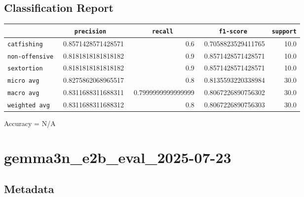 \documentclass{article}
\begin{document}
\subsection{Classification Report}

\begin{center}
\begin{tabular}{l | r | r | r | r} \hline
    \verb|            | & \verb|    precision     | & \verb|      recall      | & \verb|     f1-score     | & \verb|support| \\ \hline
    \hline
    \verb|catfishing | & 0.8571428571428571 & 0.6 & 0.7058823529411765 &    10.0 \\ \hline
    \verb|non-offensive| & 0.8181818181818182 & 0.9 & 0.8571428571428571 &    10.0 \\ \hline
    \verb|sextortion | & 0.8181818181818182 & 0.9 & 0.8571428571428571 &    10.0 \\ \hline
    \verb|micro avg  | & 0.8275862068965517 & 0.8 & 0.8135593220338984 &    30.0 \\ \hline
    \verb|macro avg  | & 0.8311688311688311 & 0.7999999999999999 & 0.8067226890756302 &    30.0 \\ \hline
    \verb|weighted avg| & 0.8311688311688312 & 0.8 & 0.8067226890756303 &    30.0 \\ \hline
\end{tabular}
\end{center}

\begin{center}
Accuracy = N/A
\end{center}

\section{gemma3n\_e2b\_eval\_2025-07-23}
\subsection{Metadata}
\end{document}
